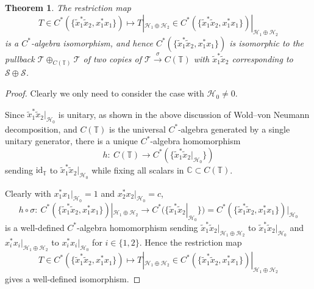 \documentclass[11pt]{article}
\numberwithin{equation}{section}
\newtheorem{theorem}{Theorem}
\begin{document}
\begin{theorem}\label{restriction} The restriction map
\[
T\in C^{\ast}( \{ \tilde{x}_{1}^{\ast}\tilde{x}_{2},x_{1}^{\ast
}x_{1} \} ) \mapsto T|_{\mathcal{H}_{1}\oplus\mathcal{H}_{2}}\in
C^{\ast}( \{ \tilde{x}_{1}^{\ast}\tilde{x}_{2},x_{1}^{\ast}%
x_{1} \} ) |_{\mathcal{H}_{1}\oplus\mathcal{H}_{2}}%
\]
is a $C^*$-algebra isomorphism, and hence $C^{\ast}( \{ \tilde{x}%
_{1}^{\ast}\tilde{x}_{2},x_{1}^{\ast}x_{1} \} ) $ is isomorphic
to the pullback $\mathcal{T}\oplus_{C(\mathbb{T}) }\mathcal{T}$
of two copies of $\mathcal{T}\overset{\sigma}{\rightarrow}C(
\mathbb{T}) $ with $\tilde{x}_{1}^{\ast}\tilde{x}_{2}$ corresponding to
$\mathcal{S}\oplus\mathcal{S}$.
\end{theorem}
\begin{proof} Clearly we only need to consider the case with $\mathcal{H}_{0}\neq0$.

Since $\tilde{x}_{1}^{\ast}\tilde{x}_{2}|_{\mathcal{H}_{0}}$ is unitary, as
shown in the above discussion of Wold--von Neumann decomposition, and $C(
\mathbb{T}) $ is the universal $C^*$-algebra generated by a single unitary
generator, there is a unique $C^*$-algebra homomorphism
\[
h\colon \ C(\mathbb{T}) \rightarrow C^{\ast}( \{ \tilde
{x}_{1}^{\ast}\tilde{x}_{2}|_{\mathcal{H}_{0}} \} )
\]
sending $\mathrm{id}_{\mathbb{T}}$ to $\tilde{x}_{1}^{\ast}\tilde{x}%
_{2}|_{\mathcal{H}_{0}}$ while fixing all scalars in $\mathbb{C}\subset
C(\mathbb{T}) $.

Clearly with $x_{1}^{\ast}x_{1}|_{\mathcal{H}_{0}}=1$ and $x_{2}^{\ast}%
x_{2}|_{\mathcal{H}_{0}}=c$,
\[
h\circ\sigma\colon \ C^{\ast}( \{ \tilde{x}_{1}^{\ast}\tilde{x}_{2}%
,x_{1}^{\ast}x_{1} \} ) |_{\mathcal{H}_{1}\oplus\mathcal{H}_{2}%
}\rightarrow C^{\ast}( \{ \tilde{x}_{1}^{\ast}\tilde{x}%
_{2}|_{\mathcal{H}_{0}} \} ) =C^{\ast}( \{ \tilde
{x}_{1}^{\ast}\tilde{x}_{2},x_{1}^{\ast}x_{1} \} ) |_{\mathcal{H}_{0}}
\]
is a well-defined $C^*$-algebra homomorphism sending $\tilde{x}_{1}^{\ast}%
\tilde{x}_{2}|_{\mathcal{H}_{1}\oplus\mathcal{H}_{2}}$ to $\tilde{x}_{1}%
^{\ast}\tilde{x}_{2}|_{\mathcal{H}_{0}}$ and $x_{i}^{\ast}x_{i}|_{\mathcal{H}%
_{1}\oplus\mathcal{H}_{2}}$ to $x_{i}^{\ast}x_{i}|_{\mathcal{H}_{0}}$ for
$i\in \{ 1,2 \} $. Hence the restriction map
\[
T\in C^{\ast}( \{ \tilde{x}_{1}^{\ast}\tilde{x}_{2},x_{1}^{\ast
}x_{1} \} ) \mapsto T|_{\mathcal{H}_{1}\oplus\mathcal{H}_{2}}\in
C^{\ast}( \{ \tilde{x}_{1}^{\ast}\tilde{x}_{2},x_{1}^{\ast}%
x_{1} \} ) |_{\mathcal{H}_{1}\oplus\mathcal{H}_{2}}
\]
gives a well-defined isomorphism.
\end{proof}
\end{document}
